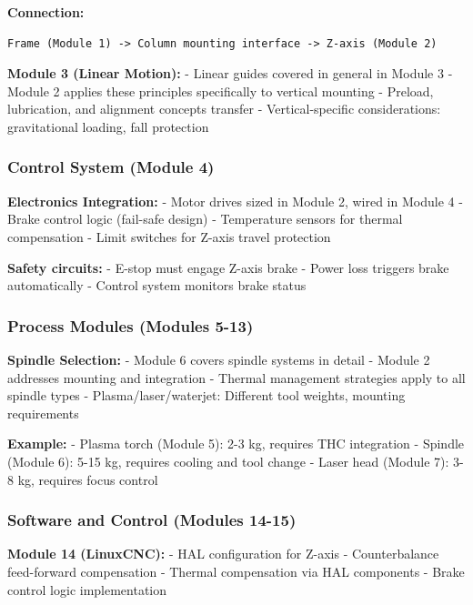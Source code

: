 \documentclass[
]{article}
\begin{document}
\textbf{Connection:}

\begin{verbatim}
Frame (Module 1) -> Column mounting interface -> Z-axis (Module 2)
\end{verbatim}

\textbf{Module 3 (Linear Motion):} - Linear guides covered in general in
Module 3 - Module 2 applies these principles specifically to vertical
mounting - Preload, lubrication, and alignment concepts transfer -
Vertical-specific considerations: gravitational loading, fall protection

\subsubsection{Control System (Module 4)}\label{control-system-module-4}

\textbf{Electronics Integration:} - Motor drives sized in Module 2,
wired in Module 4 - Brake control logic (fail-safe design) - Temperature
sensors for thermal compensation - Limit switches for Z-axis travel
protection

\textbf{Safety circuits:} - E-stop must engage Z-axis brake - Power loss
triggers brake automatically - Control system monitors brake status

\subsubsection{Process Modules (Modules
5-13)}\label{process-modules-modules-5-13}

\textbf{Spindle Selection:} - Module 6 covers spindle systems in detail
- Module 2 addresses mounting and integration - Thermal management
strategies apply to all spindle types - Plasma/laser/waterjet: Different
tool weights, mounting requirements

\textbf{Example:} - Plasma torch (Module 5): 2-3 kg, requires THC
integration - Spindle (Module 6): 5-15 kg, requires cooling and tool
change - Laser head (Module 7): 3-8 kg, requires focus control

\subsubsection{Software and Control (Modules
14-15)}\label{software-and-control-modules-14-15}

\textbf{Module 14 (LinuxCNC):} - HAL configuration for Z-axis -
Counterbalance feed-forward compensation - Thermal compensation via HAL
components - Brake control logic implementation
\end{document}
